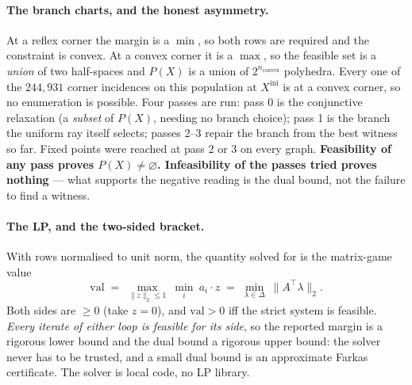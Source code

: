 \documentclass[11pt,a4paper]{article}
\theoremstyle{definition}
\begin{document}
\paragraph{The branch charts, and the honest asymmetry.} At a reflex corner the margin is a
$\min$, so both rows are required and the constraint is convex. At a convex corner it is a
$\max$, so the feasible set is a \emph{union} of two half-spaces and $P(X)$ is a union of
$2^{n_{\mathrm{convex}}}$ polyhedra. Every one of the $244{,}931$ corner incidences on this
population at $X^{\mathrm{ini}}$ is at a convex corner, so no enumeration is possible. Four
passes are run: pass 0 is the conjunctive relaxation (a \emph{subset} of $P(X)$, needing no
branch choice); pass 1 is the branch the uniform ray itself selects; passes 2--3 repair the
branch from the best witness so far. Fixed points were reached at pass 2 or 3 on every graph.
\textbf{Feasibility of any pass proves $P(X)\ne\varnothing$. Infeasibility of the passes tried
proves nothing} --- what supports the negative reading is the dual bound, not the failure to
find a witness.

\paragraph{The LP, and the two-sided bracket.} With rows normalised to unit norm, the quantity
solved for is the matrix-game value
\begin{equation}
\mathrm{val} \;=\; \max_{\|z\|_2\le1}\ \min_i\ a_i\!\cdot\! z
\;=\; \min_{\lambda\in\Delta}\ \bigl\|A^{\!\top}\lambda\bigr\|_2 .
\label{eq:conelp}
\end{equation}
Both sides are $\ge0$ (take $z=0$), and $\mathrm{val}>0$ iff the strict system is feasible.
\emph{Every iterate of either loop is feasible for its side}, so the reported margin is a
rigorous lower bound and the dual bound a rigorous upper bound: the solver never has to be
trusted, and a small dual bound is an approximate Farkas certificate. The solver is local
code, no LP library.
\end{document}

